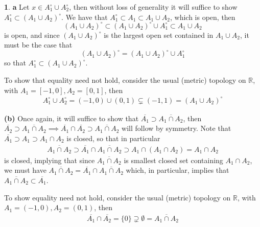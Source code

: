 \documentclass[10.5pt]{article}
\theoremstyle{definition}
\newtheorem{pb}{}
\newcommand{\set}[1]{\{#1\}}
\begin{document}
    \begin{pb}
        \textbf{a} Let \(x \in A_1^\circ \cup A_2^\circ\), then without loss of generality it will suffice to show \(A_1^\circ \subset (A_1 \cup A_2)^\circ\). We have that \(A_1^\circ \subset A_1 \subset A_1 \cup A_2\), which is open, then
        \[(A_1 \cup A_2)^\circ \subset (A_1 \cup A_2)^\circ \cup A_1^\circ \subset A_1 \cup A_2\]
        is open, and since  \((A_1 \cup A_2)^\circ\) is the largest open set contained in \(A_1 \cup A_2\), it must be the case that
        \[(A_1 \cup A_2)^\circ = (A_1 \cup A_2)^\circ \cup A_1^\circ\]
        so that \(A_1^\circ \subset (A_1 \cup A_2)^\circ\).
        
        To show that equality need not hold, consider the usual (metric) topology on \(\mathbb{R}\), with \(A_1 = [-1,0], A_2 = [0,1]\), then
        \begin{align*}
            A_1^\circ \cup A_2^\circ = (-1,0) \cup (0,1) \subsetneq (-1,1) = (A_1 \cup A_2)^\circ
        \end{align*}

        \textbf{(b)} Once again, it will suffice to show that \(\overline{A_1} \supset \overline{A_1 \cap A_2}\), then \(\overline{A_2} \supset \overline{A_1 \cap A_2} \implies \overline{A_1} \cap \overline{A_2} \supset \overline{A_1 \cap A_2}\) will follow by symmetry. Note that \(\overline{A_1} \supset A_1 \supset A_1\cap A_2\) is closed, so that in particular
        \begin{align*}
            \overline{A_1 \cap A_2} \supset \overline{A_1} \cap \overline{A_1 \cap A_2} \supset A_1 \cap (A_1 \cap A_2) = A_1 \cap A_2
        \end{align*}
        is closed, implying that since \(\overline{A_1 \cap A_2}\) is smallest closed set containing \(A_1 \cap A_2\), we must have \(\overline{A_1 \cap A_2} = \overline{A_1} \cap \overline{A_1 \cap A_2}\) which, in particular, implies that \(\overline{A_1 \cap A_2} \subset \overline{A_1}\).

        To show equality need not hold, consider the usual (metric) topology on \(\mathbb{R}\), with \(A_1 = (-1,0), A_2 = (0,1)\), then
        \begin{align*}
            \overline{A_1}\cap \overline{A_2} = \set{0} \supsetneq \emptyset = \overline{A_1 \cap A_2}
        \end{align*}
    \end{pb}
\end{document}
